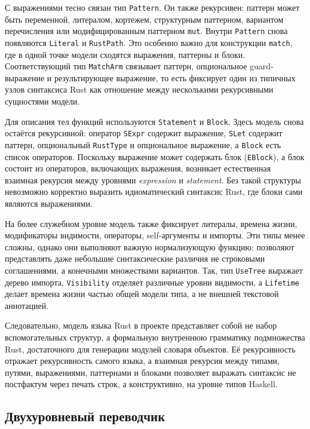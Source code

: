 \documentclass[a4paper,12pt]{article}
\begin{document}
С выражениями тесно связан тип \texttt{Pattern}. Он также рекурсивен: паттерн может быть
переменной, литералом, кортежем, структурным паттерном, вариантом перечисления или
модифицированным паттерном \texttt{mut}. Внутри \texttt{Pattern} снова появляются
\texttt{Literal} и \texttt{RustPath}. Это особенно важно для конструкции
\texttt{match}, где в одной точке модели сходятся выражения, паттерны и блоки.
Соответствующий тип \texttt{MatchArm} связывает паттерн, опциональное guard-выражение и
результирующее выражение, то есть фиксирует один из типичных узлов синтаксиса
Rust как отношение между несколькими рекурсивными сущностями модели.

Для описания тел функций используются \texttt{Statement} и \texttt{Block}. Здесь модель
снова остаётся рекурсивной: оператор \texttt{SExpr} содержит выражение,
\texttt{SLet} содержит паттерн, опциональный \texttt{RustType} и опциональное
выражение, а \texttt{Block} есть список операторов. Поскольку выражение может содержать
блок (\texttt{EBlock}), а блок состоит из операторов, включающих выражения, возникает
естественная взаимная рекурсия между уровнями \textit{expression} и \textit{statement}.
Без такой структуры невозможно корректно выразить идиоматический синтаксис Rust, где
блоки сами являются выражениями.

На более служебном уровне модель также фиксирует литералы, времена жизни, модификаторы
видимости, операторы, self-аргументы и импорты. Эти типы менее сложны, однако они
выполняют важную нормализующую функцию: позволяют представлять даже небольшие
синтаксические различия не строковыми соглашениями, а конечными множествами вариантов.
Так, тип \texttt{UseTree} выражает дерево импорта, \texttt{Visibility} отделяет
различные уровни видимости, а \texttt{Lifetime} делает времена жизни частью общей модели
типа, а не внешней текстовой аннотацией.

Следовательно, модель языка Rust в проекте представляет собой не набор вспомогательных
структур, а формальную внутреннюю грамматику подмножества Rust,
достаточного для генерации модулей словаря объектов. Её рекурсивность отражает
рекурсивность самого языка, а взаимная рекурсия между типами, путями, выражениями,
паттернами и блоками позволяет выражать синтаксис не постфактум через печать строк, а
конструктивно, на уровне типов Haskell.

\subsection{Двухуровневый переводчик}
\end{document}
